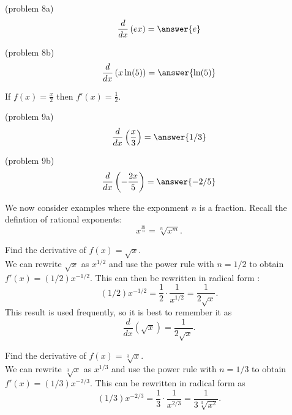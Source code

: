 \documentclass{ximera}
\begin{document}
\begin{problem}(problem 8a)
\[
\frac{d}{dx} \left(ex\right) = \answer{e}
\]
\end{problem}



\begin{problem}(problem 8b)
\[
\frac{d}{dx} \left(x\ln(5)\right) = \answer{\ln(5)}
\]
\end{problem}






\begin{example}[example 9]
If $f(x) = \frac{x}{2}$ then $f'(x) = \frac 12$.
\end{example}



\begin{problem}(problem 9a)
\[
\frac{d}{dx} \left(\frac{x}{3}\right) = \answer{1/3}
\]
\end{problem}



\begin{problem}(problem 9b)
\[
\frac{d}{dx} \left(-\frac{2x}{5}\right) = \answer{-2/5}
\]
\end{problem}






We now consider examples where the exponment $n$ is a fraction. Recall the defintion of rational exponents:
\[
x^{\frac{m}{n}} = \sqrt[n]{x^m}.
\]



\begin{example}[example 10]
Find the derivative of $f(x) = \sqrt x$.\\
We can rewrite $\sqrt x$ as $x^{1/2}$ and use the power rule 
with $n = 1/2$ to obtain $f'(x) = (1/2)x^{-1/2}$.  This can then be rewritten in radical form :
\[(1/2)x^{-1/2} = \frac{1}{2}\cdot \frac{1}{x^{1/2}} = \frac{1}{2\sqrt x}.\]
This result is used frequently, so it is best to remember it as
\[\frac{d}{dx}\left(\sqrt x\right) = \frac{1}{2\sqrt x}.\]
\end{example}




\begin{example}[example 11]
Find the derivative of $f(x) = \sqrt[3] x$.\\
We can rewrite $\sqrt[3] x$ as $x^{1/3}$ and use the power rule with $n = 1/3$ to obtain
$f'(x) = (1/3)x^{-2/3}$.  This can be rewritten in radical form as 
\[(1/3)x^{-2/3} = \frac{1}{3}\cdot \frac{1}{x^{2/3}} = \frac{1}{3\sqrt[3] {x^2}}.\]
\end{example}
\end{document}

